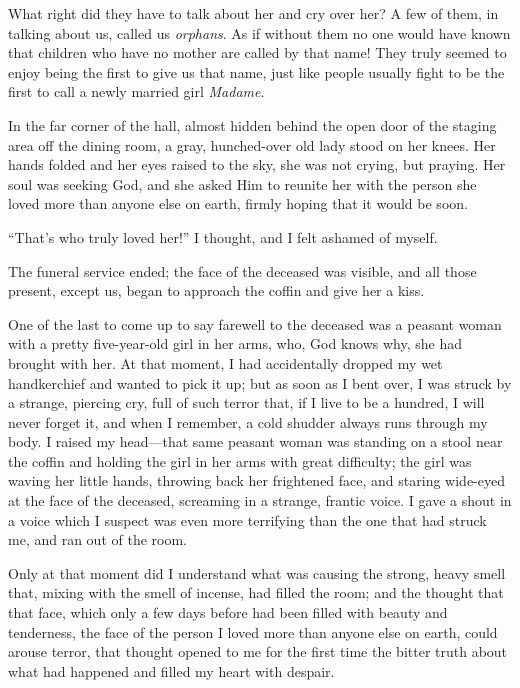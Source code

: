 What right did they have to talk about her and cry over her? A few of them, in talking about us, called us \textit{orphans}. As if without them no one would have known that children who have no mother are called by that name! They truly seemed to enjoy being the first to give us that name, just like people usually fight to be the first to call a newly married girl \textit{Madame}. 

In the far corner of the hall, almost hidden behind the open door of the staging area off the dining room, a gray, hunched-over old lady stood on her knees. Her hands folded and her eyes raised to the sky, she was not crying, but praying. Her soul was seeking God, and she asked Him to reunite her with the person she loved more than anyone else on earth, firmly hoping that it would be soon.

``That's who truly loved her!'' I thought, and I felt ashamed of myself. %

The funeral service ended; the face of the deceased was visible, and all those present, except us, began to approach the coffin and give her a kiss.

One of the last to come up to say farewell to the deceased was a peasant woman with a pretty five-year-old girl in her arms, who, God knows why, she had brought with her. At that moment, I had accidentally dropped my wet handkerchief and wanted to pick it up; but as soon as I bent over, I was struck by a strange, piercing cry, full of such terror that, if I live to be a hundred, I will never forget it, and when I remember, a cold shudder always runs through my body. I raised my head---that same peasant woman was standing on a stool near the coffin and holding the girl in her arms with great difficulty; the girl was waving her little hands, throwing back her frightened face, and staring wide-eyed at the face of the deceased, screaming in a strange, frantic voice. I gave a shout in a voice which I suspect was even more terrifying than the one that had struck me, and ran out of the room.

Only at that moment did I understand what was causing the strong, heavy smell that, mixing with the smell of incense, had filled the room; and the thought that that face, which only a few days before had been filled with beauty and tenderness, the face of the person I loved more than anyone else on earth, could arouse terror, that thought opened to me for the first time the bitter truth about what had happened and filled my heart with despair.

